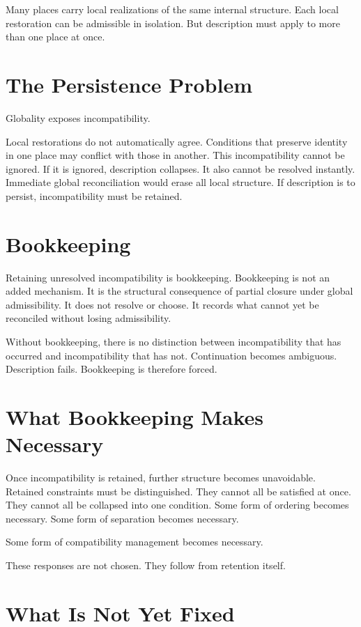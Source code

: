 \documentclass[11pt,twoside,openright]{book}
\begin{document}
Many places carry local realizations of the same internal structure. Each local restoration can be admissible in isolation. But description must apply to more than one place at once.

\section*{The Persistence Problem}

Globality exposes incompatibility.

Local restorations do not automatically agree. Conditions that preserve identity in one place may conflict with those in another. This incompatibility cannot be ignored. If it is ignored, description collapses. It also cannot be resolved instantly. Immediate global reconciliation would erase all local structure. If description is to persist, incompatibility must be retained.

\section*{Bookkeeping}

Retaining unresolved incompatibility is bookkeeping. Bookkeeping is not an added mechanism. It is the structural consequence of partial closure under global admissibility. It does not resolve or choose. It records what cannot yet be reconciled without losing admissibility.

Without bookkeeping, there is no distinction between incompatibility that has occurred and incompatibility that has not. Continuation becomes ambiguous. Description fails. Bookkeeping is therefore forced.

\section*{What Bookkeeping Makes Necessary}

Once incompatibility is retained, further structure becomes unavoidable. Retained constraints must be distinguished. They cannot all be satisfied at once. They cannot all be collapsed into one condition. Some form of ordering becomes necessary. Some form of separation becomes necessary.

Some form of compatibility management becomes necessary.

These responses are not chosen. They follow from retention itself.

\section*{What Is Not Yet Fixed}
\end{document}
